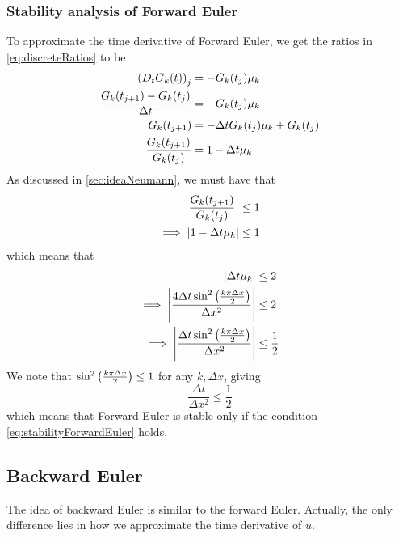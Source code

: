 \documentclass[12pt,english,a4paper]{article}
\begin{document}
\subsubsection{Stability analysis of Forward Euler}
To approximate the time derivative of Forward Euler, we get the ratios in \ref{eq:discreteRatios} to be
\begin{align*}
\qty(D_tG_k(t))_j &= -G_k(t_j)\mu_k \\
\frac{G_k(t_{j+1}) - G_k(t_j) }{\Delta t} &= -G_k(t_j)\mu_k \\
G_k(t_{j+1}) &= -\Delta t G_k(t_j)\mu_k + G_k(t_j) \\
\frac{G_k(t_{j+1}) }{G_k(t_j)} &= 1-\Delta t \mu_k
\end{align*}
As discussed in \vref{sec:ideaNeumann}, we must have that
\begin{align*}
\abs{\frac{G_k(t_{j+1}) }{G_k(t_j)}} &\leq 1 \\
\implies \abs{1-\Delta t \mu_k} &\leq 1  \\
\end{align*}
which means that 
\begin{align*}
\abs{\Delta t \mu_k} &\leq 2\\
\implies \abs{\frac{4 \Delta t \sin^2\qty(\frac{k\pi \Delta x}{2})}{\Delta x^2} } &\leq 2 \\
\implies \abs{\frac{\Delta t \sin^2\qty(\frac{k\pi \Delta x}{2})}{\Delta x^2} } &\leq \frac{1}{2}
\end{align*}
We note that \(\sin^2\qty(\frac{k\pi \Delta x}{2}) \leq 1\) for any \(k,\Delta x\), giving 
\begin{equation}\label{eq:stabilityForwardEuler}
\frac{\Delta t}{\Delta x^2} \leq \frac{1}{2}
\end{equation}
which means that Forward Euler is stable only if the condition \vref{eq:stabilityForwardEuler} holds. 
%

\subsection{Backward Euler} \label{sec:backwardEuler}
The idea of backward Euler is similar to the forward Euler. Actually, the only difference lies in how we approximate the time derivative of \(u\).
\end{document}
